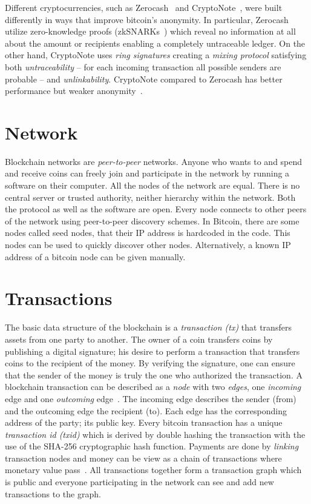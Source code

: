 Different cryptocurrencies, such as Zerocash~\cite{zcash} and CryptoNote~\cite{cryptonote}, were built differently in ways that improve bitcoin's anonymity. In particular, Zerocash utilize zero-knowledge proofs (zkSNARKs~\cite{10.1007/978-3-642-40084-1_6}) which reveal no information at all about the amount or recipients enabling a completely untraceable ledger. On the other hand, CryptoNote uses \textit{ring signatures} creating a \textit{mixing protocol} satisfying both \textit{untraceability} -- for each incoming transaction all possible senders are probable -- and \textit{unlinkability}. CryptoNote compared to Zerocash has better performance but weaker anonymity~\cite{7163021}.

\section{Network}\label{blockchain:network}

Blockchain networks are \textit{peer-to-peer} networks. Anyone who wants to and spend and receive coins can freely join and participate in the network by running a software on their computer. All the nodes of the network are equal. There is no central server or trusted authority, neither hierarchy within the network. Both the protocol as well as the software are open. Every node connects to other peers of the network using peer-to-peer discovery schemes. In Bitcoin, there are some nodes called seed nodes, that their IP address is hardcoded in the code. This nodes can be used to quickly discover other nodes. Alternatively, a known IP address of a bitcoin node can be given manually.

\section{Transactions}\label{blockchain:structure:tx}

The basic data structure of the blockchain is a \textit{transaction (tx)} that transfers assets from one party to another. The owner of a coin transfers coins by publishing a digital signature; his desire to perform a transaction that transfers coins to the recipient of the money. By verifying the signature, one can ensure that the sender of the money is truly the one who authorized the transaction. A blockchain transaction can be described as a \textit{node} with two \textit{edges}, one \textit{incoming} edge and one \textit{outcoming} edge~\cite{zindros_thesis}. The incoming edge describes the sender (from) and the outcoming edge the recipient (to). Each edge has the corresponding address of the party; its public key. Every bitcoin transaction has a unique \textit{transaction id (txid)} which is derived by double hashing the transaction with the use of the SHA-256 cryptographic hash function. Payments are done by \textit{linking} transaction nodes and money can be view as a chain of transactions where monetary value pass~\cite{zindros_thesis}. All transactions together form a transaction graph which is public and everyone participating in the network can see and add new transactions to the graph.

